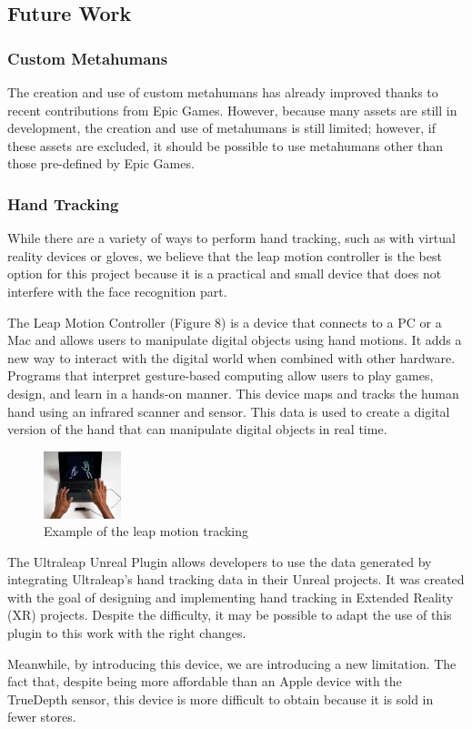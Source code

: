 \subsection{Future Work}
\subsubsection{Custom Metahumans}
The creation and use of custom metahumans has already improved thanks to recent contributions from Epic Games. However, because many assets are still in development, the creation and use of metahumans is still limited; however, if these assets are excluded, it should be possible to use metahumans other than those pre-defined by Epic Games.

\subsubsection{Hand Tracking}
While there are a variety of ways to perform hand tracking, such as with virtual reality devices or gloves, we believe that the leap motion controller is the best option for this project because it is a practical and small device that does not interfere with the face recognition part.

The Leap Motion Controller (Figure 8) is a device that connects to a PC or a Mac and allows users to manipulate digital objects using hand motions. It adds a new way to interact with the digital world when combined with other hardware. Programs that interpret gesture-based computing allow users to play games, design, and learn in a hands-on manner. This device maps and tracks the human hand using an infrared scanner and sensor. This data is used to create a digital version of the hand that can manipulate digital objects in real time.

\begin{figure}[h!]
\includegraphics[width=0.2\textwidth]{figures/leapMotion.jpg}
\centering
\caption{Example of the leap motion tracking}
\end{figure}

The Ultraleap Unreal Plugin \cite{ULT} allows developers to use the data generated by integrating Ultraleap's hand tracking data in their Unreal projects. It was created with the goal of designing and implementing hand tracking in Extended Reality (XR) projects. Despite the difficulty, it may be possible to adapt the use of this plugin to this work with the right changes.

Meanwhile, by introducing this device, we are introducing a new limitation. The fact that, despite being more affordable than an Apple device with the TrueDepth sensor, this device is more difficult to obtain because it is sold in fewer stores.
